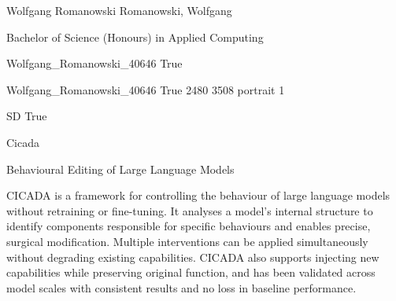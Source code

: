 \documentclass[twoside]{report}
\begin{document}
\begingroup{}\relax



\def\Key{Wolfgang_Romanowski_40646}

{Wolfgang Romanowski}
{Romanowski, Wolfgang}

{Bachelor of Science (Honours) in Applied Computing}

{Wolfgang_Romanowski_40646}
{True}

{Wolfgang_Romanowski_40646}
{True}
{2480}
{3508}
{portrait}
{1}

{SD}
{True}

{Cicada}

{Behavioural Editing of Large Language Models}

{CICADA is a framework for controlling the behaviour of large language models without retraining or fine-tuning. It analyses a model's internal structure to identify components responsible for specific behaviours and enables precise, surgical modification. Multiple interventions can be applied simultaneously without degrading existing capabilities. CICADA also supports injecting new capabilities while preserving original function, and has been validated across model scales with consistent results and no loss in baseline performance.}
\end{document}
